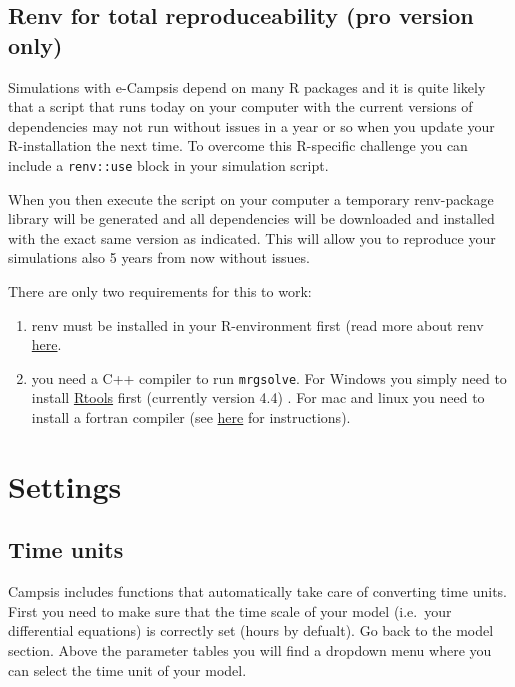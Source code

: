 \documentclass[
]{book}
\begin{document}
\section{Renv for total reproduceability (pro version only)}\label{renv-for-total-reproduceability-pro-version-only}

Simulations with e-Campsis depend on many R packages and it is quite likely that a script that runs today on your computer with the current versions of dependencies may not run without issues in a year or so when you update your R-installation the next time. To overcome this R-specific challenge you can include a \texttt{renv::use} block in your simulation script.

When you then execute the script on your computer a temporary renv-package library will be generated and all dependencies will be downloaded and installed with the exact same version as indicated. This will allow you to reproduce your simulations also 5 years from now without issues.

There are only two requirements for this to work:

\begin{enumerate}
\def\labelenumi{\arabic{enumi})}
\item
  renv must be installed in your R-environment first (read more about renv \href{https://rstudio.github.io/renv/articles/renv.html}{here}.
\item
  you need a C++ compiler to run \texttt{mrgsolve}. For Windows you simply need to install \href{https://cran.r-project.org/bin/windows/Rtools/rtools44/rtools.html}{Rtools} first (currently version 4.4) . For mac and linux you need to install a fortran compiler (see \href{https://github.com/metrumresearchgroup/mrgsolve/wiki/mrgsolve-Installation\#compilers-buid-tools}{here} for instructions).
\end{enumerate}

\chapter{Settings}\label{settings}

\section{Time units}\label{time-units}

Campsis includes functions that automatically take care of converting time units. First you need to make sure that the time scale of your model (i.e.~your differential equations) is correctly set (hours by defualt). Go back to the model section. Above the parameter tables you will find a dropdown menu where you can select the time unit of your model.
\end{document}
